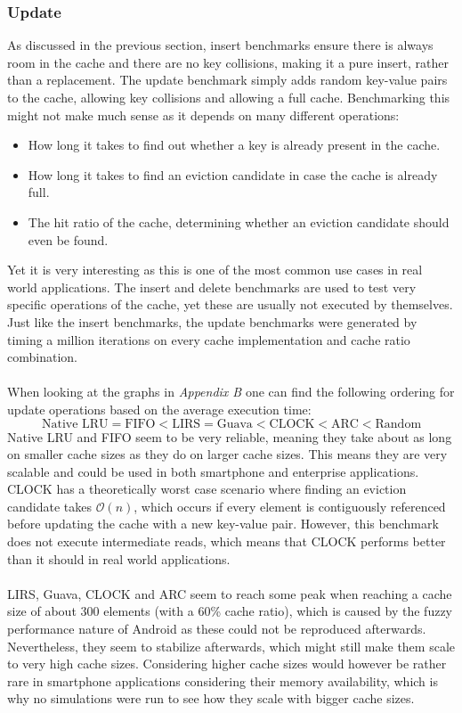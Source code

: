 \documentclass[pdftex,a4paper,12pt,twoside]{report}
\begin{document}
\subsubsection{Update}
As discussed in the previous section, insert benchmarks ensure there is always room in the cache and there are no key collisions, making it a pure insert, rather than a replacement. The update benchmark simply adds random key-value pairs to the cache, allowing key collisions and allowing a full cache. Benchmarking this might not make much sense as it depends on many different operations:
\begin{itemize}
\item How long it takes to find out whether a key is already present in the cache.
\item How long it takes to find an eviction candidate in case the cache is already full.
\item The hit ratio of the cache, determining whether an eviction candidate should even be found.
\end{itemize}
Yet it is very interesting as this is one of the most common use cases in real world applications. The insert and delete benchmarks are used to test very specific operations of the cache, yet these are usually not executed by themselves.
Just like the insert benchmarks, the update benchmarks were generated by timing a million iterations on every cache implementation and cache ratio combination.
\\\\
When looking at the graphs in \emph{Appendix B} one can find the following ordering for update operations based on the average execution time:
\[
\text{Native LRU} = \text{FIFO} < \text{LIRS} = \text{Guava} < \text{CLOCK} < \text{ARC} < \text{Random}
\]
Native LRU and FIFO seem to be very reliable, meaning they take about as long on smaller cache sizes as they do on larger cache sizes. This means they are very scalable and could be used in both smartphone and enterprise applications. CLOCK has a theoretically worst case scenario where finding an eviction candidate takes $\mathcal{O}(n)$, which occurs if every element is contiguously referenced before updating the cache with a new key-value pair. However, this benchmark does not execute intermediate reads, which means that CLOCK performs better than it should in real world applications.
\\\\
LIRS, Guava, CLOCK and ARC seem to reach some peak when reaching a cache size of about 300 elements (with a 60\% cache ratio), which is caused by the fuzzy performance nature of Android as these could not be reproduced afterwards. Nevertheless, they seem to stabilize afterwards, which might still make them scale to very high cache sizes. Considering higher cache sizes would however be rather rare in smartphone applications considering their memory availability, which is why no simulations were run to see how they scale with bigger cache sizes.
\end{document}
